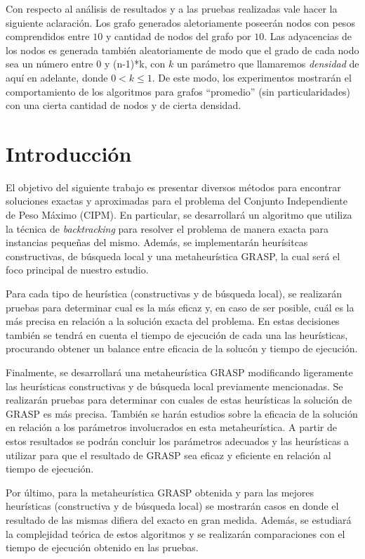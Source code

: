 \documentclass[a4paper,11pt] {article}
\begin{document}
Con respecto al análisis de resultados y a las pruebas realizadas vale hacer la siguiente aclaración. Los grafo generados aletoriamente poseerán nodos con pesos comprendidos entre $10$ y cantidad de nodos del grafo por $10$. Las adyacencias de los nodos es generada también aleatoriamente de modo que el grado de cada nodo sea un número entre 0 y (n-1)*k, con $k$ un parámetro que llamaremos \textit{densidad} de aquí en adelante, donde $0 < k \leq 1$. De este modo, los experimentos mostrarán el comportamiento de los algoritmos para grafos ``promedio'' (sin particularidades) con una cierta cantidad de nodos y de cierta densidad.

\section{Introducci\'on}

El objetivo del siguiente trabajo es presentar diversos m\'etodos para encontrar soluciones exactas y aproximadas para el problema del Conjunto Independiente de Peso M\'aximo (CIPM). En particular, se desarrollar\'a un algoritmo que utiliza la t\'ecnica de \textit{backtracking} para resolver el problema de manera exacta para instancias peque\~{n}as del mismo. Adem\'as, se implementar\'an heur\'isitcas constructivas, de b\'usqueda local y una metaheur\'istica GRASP, la cual ser\'a el foco principal de nuestro estudio.

Para cada tipo de heur\'istica (constructivas y de b\'usqueda local), se realizar\'an pruebas para determinar cual es la m\'as eficaz y, en caso de ser posible, cu\'al es la m\'as precisa en relaci\'on a la soluci\'on exacta del problema. En estas decisiones tambi\'en se tendr\'a en cuenta el tiempo de ejecuci\'on de cada una las heur\'isticas, procurando obtener un balance entre eficacia de la soluc\'on y tiempo de ejecuci\'on.

Finalmente, se desarrollar\'a una metaheur\'istica GRASP modificando ligeramente las heur\'isticas constructivas y de b\'usqueda local previamente mencionadas. Se realizar\'an pruebas para determinar con cuales de estas heur\'isticas la soluci\'on de GRASP es m\'as precisa. Tambi\'en se har\'an estudios sobre la eficacia de la soluci\'on en relaci\'on a los par\'ametros involucrados en esta metaheur\'istica. A partir de estos resultados se podr\'an concluir los par\'ametros adecuados y las heur\'isticas a utilizar para que el resultado de GRASP sea eficaz y eficiente en relaci\'on al tiempo de ejecuci\'on.

Por \'ultimo, para la metaheur\'istica GRASP obtenida y para las mejores heur\'isticas (constructiva y de b\'usqueda local) se mostrar\'an casos en donde el resultado de las mismas difiera del exacto en gran medida. Adem\'as, se estudiar\'a la complejidad te\'orica de estos algoritmos y se realizar\'an comparaciones con el tiempo de ejecuci\'on obtenido en las pruebas.
\end{document}

